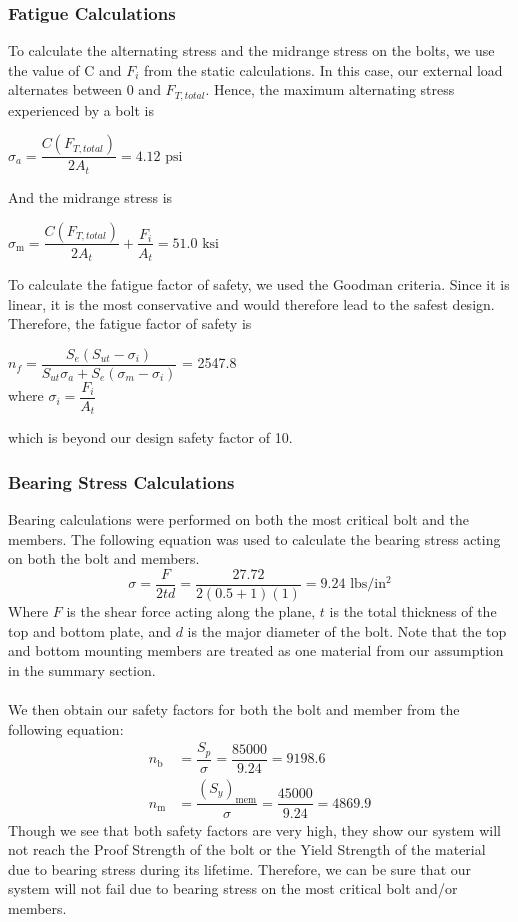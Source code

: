 \documentclass[letterpaper,12pt]{article}
\begin{document}
\subsubsection{Fatigue Calculations}
To calculate the alternating stress and the midrange stress on the bolts, we use the value of C and $F_{i}$ from the static calculations. 
In this case, our external load alternates between 0 and $F_{T,total}$. Hence, the maximum alternating stress experienced by a bolt is
\begin{center}
    $\sigma _ { a } = \dfrac { C ( F _ { T,total })  } { 2 A _ { t } } = 4.12 \text{ psi}$
\end{center}
And the midrange stress is
\begin{center}
    $\sigma _ { \mathrm { m } } = \dfrac { C( F_{T,total}) } { 2 A _ { t } } + \dfrac { F _ { i } } { A _ { t } } = 51.0 \text{ ksi}$
\end{center}
To calculate the fatigue factor of safety, we used the Goodman criteria. Since it is linear, it is the most conservative and would therefore lead to the safest design. Therefore, the fatigue factor of safety is
\begin{center}
    $n _ { f } = \dfrac { S _ { e } \left( S _ { u t } - \sigma _ { i } \right) } { S _ { u t } \sigma _ { a } + S _ { e } \left( \sigma _ { m } - \sigma _ { i } \right) }$ = 2547.8\\
    \bigskip
    where $\sigma_i = \dfrac{F_{i}}{A_{t}}$
\end{center}
which is beyond our design safety factor of 10.
\subsubsection{Bearing Stress Calculations}
Bearing calculations were performed on both the most critical bolt and the members. The following equation was used to calculate the bearing stress acting on both the bolt and members. 
\begin{equation*}
    \sigma = \dfrac{F}{2td} = \dfrac{27.72}{2(0.5+1)(1)} = 9.24 \text{ lbs/in$^2$}
\end{equation*}
Where $F$ is the shear force acting along the plane, $t$ is the total thickness of the top and bottom plate, and $d$ is the major diameter of the bolt. Note that the top and bottom mounting members are treated as one material from our assumption in the summary section.\\\\
We then obtain our safety factors for both the bolt and member from the following equation:
\begin{align*}
    n_{\text{b}} &= \dfrac{S_p}{\sigma} = \dfrac{85000}{9.24} = 9198.6\\
    n_{\text{m}} &= \dfrac{(S_y)_{\text{mem}}}{\sigma} = \dfrac{45000}{9.24} = 4869.9
\end{align*}
Though we see that both safety factors are very high, they show our system will not reach the Proof Strength of the bolt or the Yield Strength of the material due to bearing stress during its lifetime. Therefore, we can be sure that our system will not fail due to bearing stress on the most critical bolt and/or members.
\end{document}
